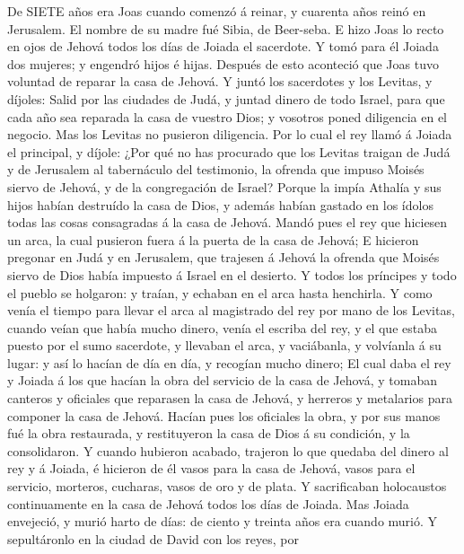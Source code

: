  De SIETE años era Joas cuando comenzó á reinar, y cuarenta
años reinó en Jerusalem. El nombre de su madre fué Sibia, de Beer-seba.
 E hizo Joas lo recto en ojos de Jehová todos los días de
Joiada el sacerdote.  Y tomó para él Joiada dos mujeres; y
engendró hijos é hijas.  Después de esto aconteció que Joas
tuvo voluntad de reparar la casa de Jehová.  Y juntó los
sacerdotes y los Levitas, y díjoles: Salid por las ciudades de Judá, y
juntad dinero de todo Israel, para que cada año sea reparada la casa de
vuestro Dios; y vosotros poned diligencia en el negocio. Mas los Levitas
no pusieron diligencia.  Por lo cual el rey llamó á Joiada
el principal, y díjole: ¿Por qué no has procurado que los Levitas
traigan de Judá y de Jerusalem al tabernáculo del testimonio, la ofrenda
que impuso Moisés siervo de Jehová, y de la congregación de Israel?
 Porque la impía Athalía y sus hijos habían destruído la
casa de Dios, y además habían gastado en los ídolos todas las cosas
consagradas á la casa de Jehová.  Mandó pues el rey que
hiciesen un arca, la cual pusieron fuera á la puerta de la casa de
Jehová;  E hicieron pregonar en Judá y en Jerusalem, que
trajesen á Jehová la ofrenda que Moisés siervo de Dios había impuesto á
Israel en el desierto.  Y todos los príncipes y todo el
pueblo se holgaron: y traían, y echaban en el arca hasta henchirla.
 Y como venía el tiempo para llevar el arca al magistrado
del rey por mano de los Levitas, cuando veían que había mucho dinero,
venía el escriba del rey, y el que estaba puesto por el sumo sacerdote,
y llevaban el arca, y vaciábanla, y volvíanla á su lugar: y así lo
hacían de día en día, y recogían mucho dinero;  El cual
daba el rey y Joiada á los que hacían la obra del servicio de la casa de
Jehová, y tomaban canteros y oficiales que reparasen la casa de Jehová,
y herreros y metalarios para componer la casa de Jehová. 
Hacían pues los oficiales la obra, y por sus manos fué la obra
restaurada, y restituyeron la casa de Dios á su condición, y la
consolidaron.  Y cuando hubieron acabado, trajeron lo que
quedaba del dinero al rey y á Joiada, é hicieron de él vasos para la
casa de Jehová, vasos para el servicio, morteros, cucharas, vasos de oro
y de plata. Y sacrificaban holocaustos continuamente en la casa de
Jehová todos los días de Joiada.  Mas Joiada envejeció, y
murió harto de días: de ciento y treinta años era cuando murió.
 Y sepultáronlo en la ciudad de David con los reyes, por
